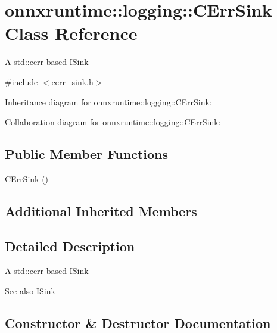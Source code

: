 \hypertarget{classonnxruntime_1_1logging_1_1CErrSink}{}\section{onnxruntime\+:\+:logging\+:\+:C\+Err\+Sink Class Reference}
\label{classonnxruntime_1_1logging_1_1CErrSink}


A std\+::cerr based \mbox{\hyperlink{classonnxruntime_1_1logging_1_1ISink}{I\+Sink}}  




{\ttfamily \#include $<$cerr\+\_\+sink.\+h$>$}



Inheritance diagram for onnxruntime\+:\+:logging\+:\+:C\+Err\+Sink\+:


Collaboration diagram for onnxruntime\+:\+:logging\+:\+:C\+Err\+Sink\+:
\subsection*{Public Member Functions}
\begin{DoxyCompactItemize}
\item 
\mbox{\hyperlink{classonnxruntime_1_1logging_1_1CErrSink_a0e7a14c81002503fe26aebcac078f18b}{C\+Err\+Sink}} ()
\end{DoxyCompactItemize}
\subsection*{Additional Inherited Members}


\subsection{Detailed Description}
A std\+::cerr based \mbox{\hyperlink{classonnxruntime_1_1logging_1_1ISink}{I\+Sink}} 

\begin{DoxySeeAlso}{See also}
\mbox{\hyperlink{classonnxruntime_1_1logging_1_1ISink}{I\+Sink}}


\end{DoxySeeAlso}


\subsection{Constructor \& Destructor Documentation}
\mbox{\label{classonnxruntime_1_1logging_1_1CErrSink_a0e7a14c81002503fe26aebcac078f18b}} 
